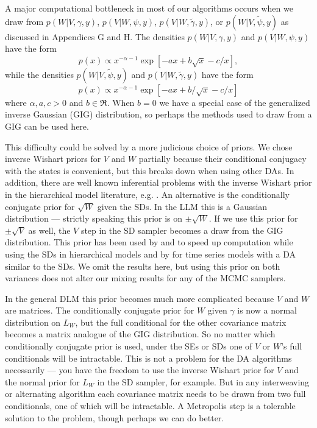 \documentclass[12pt]{article}
\begin{document}
A major computational bottleneck in most of our algorithms occurs when we draw from $p(W|V,\gamma,y)$, $p(V|W,\psi,y)$, $p(V|W,\tilde{\gamma},y)$, or $p(W|V,\tilde{\psi},y)$ as discussed in Appendices G and H. The densities $p(W|V,\gamma,y)$ and $p(V|W,\psi,y)$ have the form \vspace{-0.1in}
\[ 
p(x)\propto x^{-\alpha-1}\exp\left[-ax + b\sqrt{x} - c/x\right],
\]
while the densities $p(W|V,\tilde{\psi},y)$ and $p(V|W,\tilde{\gamma},y)$ have the form \vspace{-0.1in}
\[
p(x)\propto x^{-\alpha-1}\exp\left[ -ax + b/\sqrt{x} -c/x\right]
\]
where $\alpha,a,c>0$ and $b\in\Re$. When $b=0$ we have a special case of the generalized inverse Gaussian (GIG) distribution, so perhaps the methods used to draw from a GIG can be used here. 

This difficulty could be solved by a more judicious choice of priors. We chose inverse Wishart priors for $V$ and $W$ partially because their conditional conjugacy with the states is convenient, but this breaks down when using other DAs. In addition, there are well known inferential problems with the inverse Wishart prior in the hierarchical model literature, e.g. \citet{gelman2006prior}. An alternative is the conditionally conjugate prior for $\sqrt{W}$ given the SDs. In the LLM this is a Gaussian distribution --- strictly speaking this prior is on $\pm \sqrt{W}$. If we use this prior for $\pm\sqrt{V}$ as well, the $V$ step in the SD sampler becomes a draw from the GIG distribution. This prior has been used by \citet{fruhwirth2011bayesian} and \citet{fruhwirth2008bayesian} to speed up computation while using the SDs in hierarchical models and by \citet{fruhwirth2010stochastic} for time series models with a DA similar to the SDs. We omit the results here, but using this prior on both variances does not alter our mixing results for any of the MCMC samplers.

In the general DLM this prior becomes much more complicated because $V$ and $W$ are matrices. The conditionally conjugate prior for $W$ given $\gamma$ is now a normal distribution on $L_W$, but the full conditional for the other covariance matrix becomes a matrix analogue of the GIG distribution. So no matter which conditionally conjugate prior is used, under the SEs or SDs one of $V$ or $W$'s full conditionals will be intractable. This is not a problem for the DA algorithms necessarily --- you have the freedom to use the inverse Wishart prior for $V$ and the normal prior for $L_W$ in the SD sampler, for example. But in any interweaving or alternating algorithm each covariance matrix needs to be drawn from two full conditionals, one of which will be intractable. A Metropolis step is a tolerable solution to the problem, though perhaps we can do better.
\end{document}

